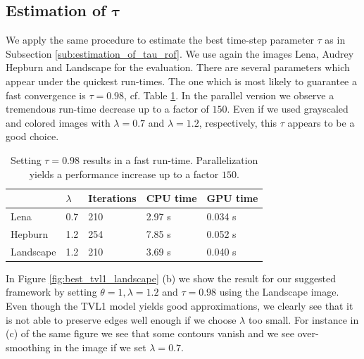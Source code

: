 \documentclass[abstracton]{scrreprt}
\begin{document}
        \subsection{Estimation of $\boldsymbol{\tau}$} %
        \label{sub:estimation_of_tau_tvl1}
            
            We apply the same procedure to estimate the best time-step parameter $\tau$ as in Subsection \ref{sub:estimation_of_tau_rof}. We use again the images Lena, Audrey Hepburn and Landscape for the evaluation. There are several parameters which appear under the quickest run-times. The one which is most likely to guarantee a fast convergence is $\tau = 0.98$, cf. Table \ref{tab:tvl1_cpu_vs_gpu}. In the parallel version we observe a tremendous run-time decrease up to a factor of $150$. Even if we used grayscaled and colored images with $\lambda = 0.7$ and $\lambda = 1.2$, respectively, this $\tau$ appears to be a good choice.
            \begin{table}[!ht]
                \centering
                \begin{tabular}{| l || l | l | l | l |}
                    \hline
                    & $\lambda$ & Iterations & CPU time & GPU time \\ \hline
                    Lena & 0.7 & 210 & 2.97 s & 0.034 s \\ \hline
                    Hepburn & 1.2 & 254 & 7.85 s & 0.052 s \\ \hline
                    Landscape & 1.2 & 210 & 3.69 s & 0.040 s \\ \hline
                \end{tabular}
                \caption[Run-times for best parameters in TVL1 model.]{Setting $\tau = 0.98$ results in a fast run-time. Parallelization yields a performance increase up to a factor $150$.}
                \label{tab:tvl1_cpu_vs_gpu}
            \end{table}
            In Figure \ref{fig:best_tvl1_landscape} (b) we show the result for our suggested framework by setting $\theta = 1, \lambda = 1.2$ and $\tau = 0.98$ using the Landscape image. Even though the TVL1 model yields good approximations, we clearly see that it is not able to preserve edges well enough if we choose $\lambda$ too small. For instance in (c) of the same figure we see that some contours vanish and we see over-smoothing in the image if we set $\lambda = 0.7$.\\
\end{document}
